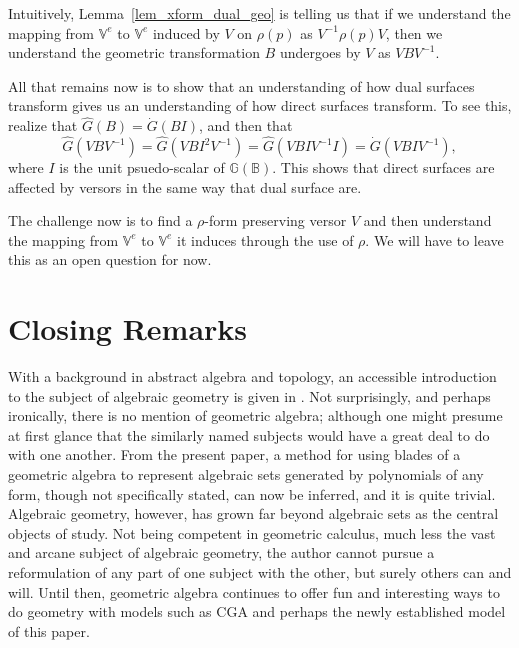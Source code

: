 \documentclass{birkjour}
\theoremstyle{definition}
\theoremstyle{remark}
\numberwithin{equation}{section}
\newcommand{\G}{\mathbb{G}}
\newcommand{\V}{\mathbb{V}}
\newcommand{\B}{\mathbb{B}}
\newcommand{\Gi}{\dot{G}}
\newcommand{\Go}{\hat{G}}
\begin{document}
Intuitively, Lemma~\ref{lem_xform_dual_geo} is telling us that if
we understand the mapping from $\V^e$ to $\V^e$ induced by $V$ on $\rho(p)$ as $V^{-1}\rho(p)V$,
then we understand the geometric transformation $B$ undergoes by $V$ as $VBV^{-1}$.

All that remains now is to show that an understanding of how dual surfaces
transform gives us an understanding of how direct surfaces transform.
To see this, realize that $\Go(B)=\Gi(BI)$, and then that
\begin{equation}
\Go(VBV^{-1})=\Go(VBI^2V^{-1})=\Go(VBIV^{-1}I)=\Gi(VBIV^{-1}),
\end{equation}
where $I$ is the unit psuedo-scalar of $\G(\B)$.  This shows that
direct surfaces are affected by versors in the same way that dual surface are.

The challenge now is to find a $\rho$-form preserving versor $V$ and then
understand the mapping from $\V^e$ to $\V^e$ it induces through
the use of $\rho$.  We will have to leave this as
an open question for now.

\section{Closing Remarks}

With a background in abstract algebra and topology, an accessible
introduction to the subject of algebraic geometry is given in \cite{Milne12}.
Not surprisingly, and perhaps ironically, there is no mention of geometric algebra; although
one might presume at first glance that the similarly named subjects would have a great deal to do
with one another.  From the present paper, a method for using blades of a geometric
algebra to represent algebraic sets generated by polynomials of any form, though not specifically stated,
can now be inferred, and it is quite trivial.  Algebraic geometry, however, has grown far beyond
algebraic sets as the central objects of study.  Not being competent in geometric calculus,
much less the vast and arcane subject of algebraic geometry, the author cannot pursue
a reformulation of any part of one subject with the other, but surely others can and will.
Until then, geometric algebra continues to offer fun and interesting ways to do geometry
with models such as CGA and perhaps the newly established model of this paper.

\nocite{Dorst07}
\nocite{Sobczyk12}



\end{document}
